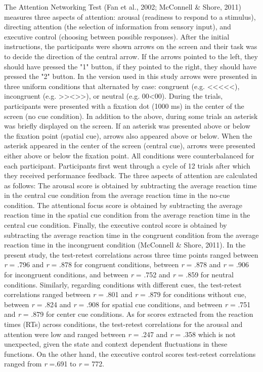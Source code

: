 \documentclass[authordate, empirical]{jote-new-article}
\begin{document}
The Attention Networking Test\textbf{ }(Fan et al., 2002; McConnell \& Shore, 2011) measures three aspects of attention: arousal (readiness to respond to a stimulus), directing attention (the selection of information from sensory input), and executive control (choosing between possible responses). After the initial instructions, the participants were shown arrows on the screen and their task was to decide the direction of the central arrow. If the arrows pointed to the left, they should have pressed the "1" button, if they pointed to the right, they should have pressed the "2" button. In the version used in this study arrows were presented in three uniform conditions that alternated by case: congruent (e.g. <\null<\null<\null<\null<), incongruent (e.g. >\null>\null<\null>\null>), or neutral (e.g. 00<00). During the trials, participants were presented with a fixation dot (1000 ms) in the center of the screen (no cue condition). In addition to the above, during some trials an asterisk was briefly displayed on the screen. If an asterisk was presented above or below the fixation point (spatial cue), arrows also appeared above or below. When the asterisk appeared in the center of the screen (central cue), arrows were presented either above or below the fixation point. All conditions were counterbalanced for each participant. Participants first went through a cycle of 12 trials after which they received performance feedback. The three aspects of attention are calculated as follows: The arousal score is obtained by subtracting the average reaction time in the central cue condition from the average reaction time in the no-cue condition. The attentional focus score is obtained by subtracting the average reaction time in the spatial cue condition from the average reaction time in the central cue condition. Finally, the executive control score is obtained by subtracting the average reaction time in the congruent condition from the average reaction time in the incongruent condition (McConnell \& Shore, 2011). In the present study, the test-retest correlations across three time points ranged between \emph{r} = .796 and \emph{r} = .878 for congruent conditions, between \emph{r} = .878 and \emph{r} = .906 for incongruent conditions, and between \emph{r} = .752 and \emph{r} = .859 for neutral conditions. Similarly, regarding conditions with different cues, the test-retest correlations ranged between \emph{r} = .801 and \emph{r }= .879 for conditions without cue, between \emph{r} = .824 and \emph{r }= .908 for spatial cue conditions, and between \emph{r} = .751 and \emph{r} = .879 for center cue conditions. As for scores extracted from the reaction times (RTs) across conditions, the test-retest correlations for the arousal and attention were low and ranged between \emph{r} = .247 and \emph{r} = .358 which is not unexpected, given the state and context dependent fluctuations in these functions. On the other hand, the executive control scores test-retest correlations ranged from \emph{r} =.691 to \emph{r} = 772.
\end{document}
